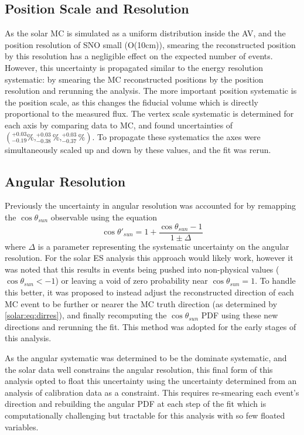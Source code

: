 \subsection{Position Scale and Resolution}

As the solar MC is simulated as a uniform distribution inside the AV, and the position resolution of SNO small (O(10cm)), smearing the reconstructed position by this resolution has a 
negligible effect on the expected number of events.
However, this uncertainty is propagated similar to the energy resolution systematic: by smearing the MC reconstructed positions by the position resolution and rerunning the analysis.
The more important position systematic is the position scale, as this changes the fiducial volume which is directly proportional to the measured flux.
The vertex scale systematic is determined for each axis by comparing \N data to MC, and found uncertainties of $(^{+0.03}_{-0.19}\%,^{+0.03}_{-0.38}\%,^{+0.03}_{-0.37}\%)$.
To propagate these systematics the axes were simultaneously scaled up and down by these values, and the fit was rerun.

\subsection{Angular Resolution}

Previously the uncertainty in angular resolution was accounted for by remapping the $\cos{\theta_{sun}}$ observable using the equation
\begin{equation}
\cos{\theta'_{sun}} = 1 + \frac{\cos{\theta_{sun}}-1}{1\pm\Delta}
\label{solar:eq:dirres}
\end{equation}
where $\Delta$ is a parameter representing the systematic uncertainty on the angular resolution.
For the solar ES analysis this approach would likely work, however it was noted that this results in events being pushed into non-physical values ($\cos \theta_{sun} < -1$) or leaving a void of zero probability near $\cos \theta_{sun} = 1$.
To handle this better, it was proposed to instead adjust the reconstructed direction of each MC event to be further or nearer the MC truth direction (as determined by  \ref{solar:eq:dirres}), and finally recomputing the $\cos \theta_{sun}$ PDF using these new directions and rerunning the fit.
This method was adopted for the early stages of this analysis.

As the angular systematic was determined to be the dominate systematic, and the solar data well constrains the angular resolution, this final form of this analysis opted to float this uncertainty using the uncertainty determined from an analysis of \N calibration data as a constraint.
This requires re-smearing each event's direction and rebuilding the angular PDF at each step of the fit which is computationally challenging but tractable for this analysis with so few floated variables.

